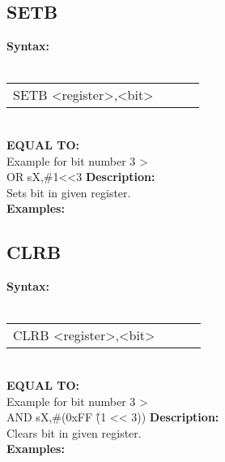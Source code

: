                 \subsection{SETB}
                \textbf{Syntax:}\\
                \\ {
                    \texttt{}
                    \begin{tabular}[h!]{llll}
                            { \color{highlight_instruction} SETB    } { \color{highlight_symbol} <register>,<bit> }
                            { \color{highlight_comment}  }\\
                    \end{tabular}
                    }\\
                    \textbf{EQUAL TO:}\\
                    Example for bit number 3 >\\
                    { \color{highlight_instruction} OR    } { \color{highlight_symbol}      sX,\#1<<3 }
                \textbf{Description:}\\
                Sets bit in given register.\\
                \textbf{Examples:}\\
                        \begin{code}[h!]
                            symbol}\verb'SETB          s0,#3' }\\
                        \end{code}

                \subsection{CLRB}
                \textbf{Syntax:}\\
                \\ {
                    \texttt{}
                    \begin{tabular}[h!]{llll}
                            { \color{highlight_instruction} CLRB    } { \color{highlight_symbol} <register>,<bit> }
                            { \color{highlight_comment}  }\\
                    \end{tabular}
                    }\\
                    \textbf{EQUAL TO:}\\
                    Example for bit number 3 >\\
                    { \color{highlight_instruction} AND    } { \color{highlight_symbol}    sX,\#(0xFF \^ (1 << 3)) }
                \textbf{Description:}\\
                Clears bit in given register.\\
                \textbf{Examples:}\\
                        \begin{code}[h!]
                            symbol}\verb'CLRB          s0,#3' }\\
                        \end{code}

